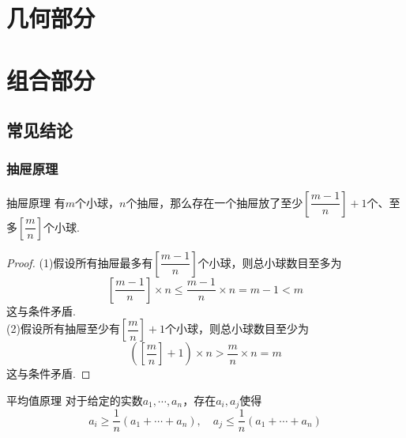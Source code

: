 \documentclass[lang=cn, zihao=4.5]{elegantbook}
\newcommand{\ssb}[1]{\left( #1 \right)}
\begin{document}
\part{几何部分}

\part{组合部分}

\chapter{常见结论}

\section{抽屉原理}

\begin{theorem}{抽屉原理}
	有$m$个小球，$n$个抽屉，那么存在一个抽屉放了至少$\left[ \dfrac{m-1}{n} \right]+1$个、至多$\left[ \dfrac{m}{n} \right]$个小球.
\end{theorem}
\begin{proof}
	(1)假设所有抽屉最多有$\left[ \dfrac{m-1}{n} \right]$个小球，则总小球数目至多为$$\left[ \frac{m-1}{n} \right] \times n \leq \frac{m-1}{n} \times n = m-1 < m$$
	这与条件矛盾. \\
	(2)假设所有抽屉至少有$\left[ \dfrac{m}{n} \right] + 1$个小球，则总小球数目至少为$$\ssb{\left[ \dfrac{m}{n} \right] + 1} \times n > \frac{m}{n} \times n = m$$
	这与条件矛盾.
\end{proof}

\begin{corollary}{平均值原理}
	对于给定的实数$a_1, \cdots ,a_n$，存在$a_i,a_j$使得$$a_i \geq \dfrac{1}{n}(a_1+ \cdots +a_n), \quad a_j \leq \dfrac{1}{n}(a_1+ \cdots +a_n)$$
\end{corollary}
\end{document}
